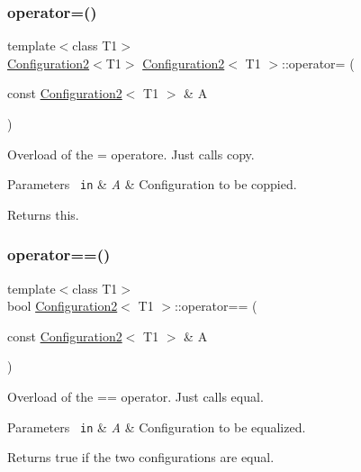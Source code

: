 \subsubsection{\texorpdfstring{operator=()}{operator=()}}
{\footnotesize\ttfamily template$<$class T1$>$ \\
\mbox{\hyperlink{class_configuration2}{Configuration2}}$<$T1$>$ \mbox{\hyperlink{class_configuration2}{Configuration2}}$<$ T1 $>$\+::operator= (\begin{DoxyParamCaption}\item[{const \mbox{\hyperlink{class_configuration2}{Configuration2}}$<$ T1 $>$ \&}]{A }\end{DoxyParamCaption})\hspace{0.3cm}{\ttfamily [inline]}}



Overload of the = operatore. Just calls {\ttfamily copy}. 


\begin{DoxyParams}[1]{Parameters}
\mbox{\texttt{ in}}  & {\em A} & Configuration to be coppied. \\
\hline
\end{DoxyParams}
\begin{DoxyReturn}{Returns}
this. 
\end{DoxyReturn}
\mbox{\label{class_configuration2_a7dda6b86ded2376a78a7f3d9f2811740}} 
\subsubsection{\texorpdfstring{operator==()}{operator==()}}
{\footnotesize\ttfamily template$<$class T1$>$ \\
bool \mbox{\hyperlink{class_configuration2}{Configuration2}}$<$ T1 $>$\+::operator== (\begin{DoxyParamCaption}\item[{const \mbox{\hyperlink{class_configuration2}{Configuration2}}$<$ T1 $>$ \&}]{A }\end{DoxyParamCaption})\hspace{0.3cm}{\ttfamily [inline]}}



Overload of the == operator. Just calls {\ttfamily equal}. 


\begin{DoxyParams}[1]{Parameters}
\mbox{\texttt{ in}}  & {\em A} & Configuration to be equalized. \\
\hline
\end{DoxyParams}
\begin{DoxyReturn}{Returns}
true if the two configurations are equal. 
\end{DoxyReturn}
\mbox{\label{class_configuration2_a15ce37ad4eae9f4a980fc3578765984d}} 
